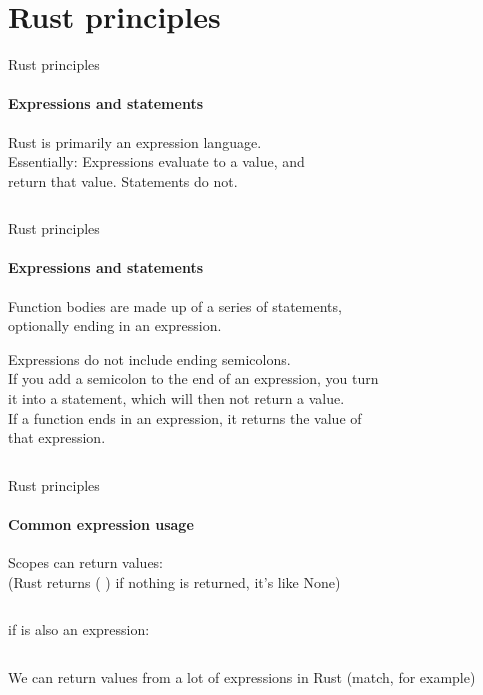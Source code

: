 \documentclass[usenames,dvipsnames,10pt,aspectratio=169]{beamer}
\begin{document}

\section{Rust principles}
\begin{frame}{Rust principles}
\framesubtitle{Expressions and statements}
\large{\textcolor{ucuyellow}{Rust is primarily an expression language.\\}}
\vspace{0.5cm}
Essentially: Expressions evaluate to a value, and\\
return that value. Statements do not.
\vspace{0.5cm}
\inputminted[fontsize=\large]{rust}{code/expression1.rs}
\end{frame}

\begin{frame}{Rust principles}
\framesubtitle{Expressions and statements}
\normalsize
Function bodies are made up of a series of statements, \\
optionally ending in an expression.

\vspace{0.4cm}
Expressions do not include ending semicolons.\\

\vspace{0.4cm}
If you add a semicolon to the end of an expression, you turn \\
it into a statement, which will then not return a value.\\
If a function ends in an expression, it returns the value of\\
that expression.
\vspace{0.5cm}
\inputminted[fontsize=\large]{rust}{code/expression2.rs}
\vspace{0.5cm}
\end{frame}

\begin{frame}{Rust principles}
\framesubtitle{Common expression usage}
\large
Scopes can return values:\\
(Rust returns \textcolor{ucuyellow}{( )} if nothing is returned, it's like None)
\inputminted[fontsize=\large]{rust}{code/expression3.rs}
\vspace{0.7cm}
\textcolor{ucuyellow}{if}
is also an expression:
\inputminted[fontsize=\large]{rust}{code/expression4.rs}
\vspace{0.5cm}
\normalsize
We can return values from a lot of expressions in Rust 
(\textcolor{ucuyellow}{match}, for example)
\end{frame}
\end{document}
